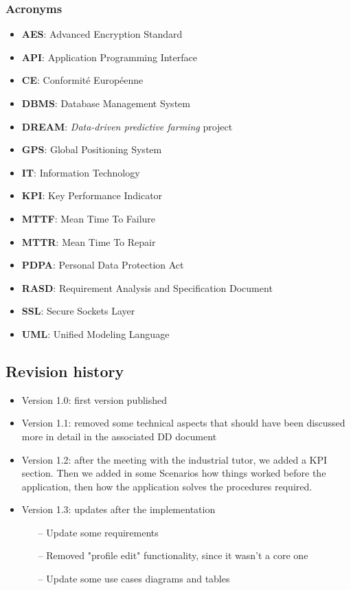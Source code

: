 \documentclass[table, 12pt]{article}
\begin{document}
\subsubsection*{Acronyms}
\begin{itemize}
    \item \textbf{AES}: Advanced Encryption Standard
    \item \textbf{API}: Application Programming Interface
    \item \textbf{CE}: Conformité Européenne
    \item \textbf{DBMS}: Database Management System
    \item \textbf{DREAM}: \emph{Data-driven predictive farming} project
    \item \textbf{GPS}: Global Positioning System
    \item \textbf{IT}: Information Technology
    \item \textbf{KPI}: Key Performance Indicator
    \item \textbf{MTTF}: Mean Time To Failure
    \item \textbf{MTTR}: Mean Time To Repair
    \item \textbf{PDPA}: Personal Data Protection Act 
    \item \textbf{RASD}: Requirement Analysis and Specification Document
    \item \textbf{SSL}: Secure Sockets Layer
    \item \textbf{UML}: Unified Modeling Language
\end{itemize}
\subsection{Revision history}
\begin{itemize}
    \item Version 1.0: first version published
    \item Version 1.1: removed some technical aspects that should have been discussed more in detail in the associated DD document
    \item Version 1.2: after the meeting with the industrial tutor, we added a KPI section. Then we added in some Scenarios how things worked before the application, then how the application solves the procedures required.
    \item Version 1.3: updates after the implementation
    \begin{itemize}
        \item[--] Update some requirements
        \item[--] Removed "profile edit" functionality, since it wasn't a core one
        \item[--] Update some use cases diagrams and tables 
    \end{itemize}
\end{itemize}
\end{document}
